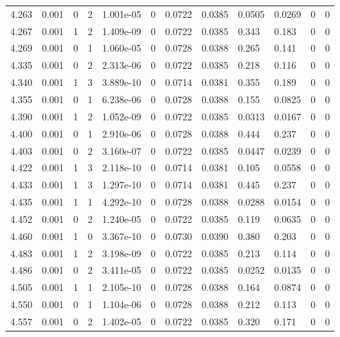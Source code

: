 \documentclass[preview]{standalone}
\begin{document}
{{{{{{\begin{tabular}{L{1.2cm}C{1.2cm} C{0.3cm}C{0.5cm} C{1.4cm}C{1.4cm} C{1.4cm}C{1.4cm} C{1.6cm}C{1.6cm} C{1.6cm}C{1.6cm}}
  4.263  &  0.001  & 0     &  2 &  1.001e-05  & 0  &  0.0722&   0.0385& 0.0505 & 0.0269   &  0 & 0  \\ 
  4.267  &  0.001  & 1     &  2 &  1.409e-09  & 0  &  0.0722&   0.0385& 0.343 & 0.183   &  0 & 0  \\ 
  4.269  &  0.001  & 0     &  1 &  1.060e-05  & 0  &  0.0728&   0.0388& 0.265 & 0.141   &  0 & 0  \\ 
  4.335  &  0.001  & 0     &  2 &  2.313e-06  & 0  &  0.0722&   0.0385& 0.218 & 0.116   &  0 & 0  \\ 
  4.340  &  0.001  & 1     &  3 &  3.889e-10  & 0  &  0.0714&   0.0381& 0.355 & 0.189   &  0 & 0  \\ 
  4.355  &  0.001  & 0     &  1 &  6.238e-06  & 0  &  0.0728&   0.0388& 0.155 & 0.0825   &  0 & 0  \\ 
  4.390  &  0.001  & 1     &  2 &  1.052e-09  & 0  &  0.0722&   0.0385& 0.0313 & 0.0167   &  0 & 0  \\ 
  4.400  &  0.001  & 0     &  1 &  2.910e-06  & 0  &  0.0728&   0.0388& 0.444 & 0.237   &  0 & 0  \\ 
  4.403  &  0.001  & 0     &  2 &  3.160e-07  & 0  &  0.0722&   0.0385& 0.0447 & 0.0239   &  0 & 0  \\ 
  4.422  &  0.001  & 1     &  3 &  2.118e-10  & 0  &  0.0714&   0.0381& 0.105 & 0.0558   &  0 & 0  \\ 
  4.433  &  0.001  & 1     &  3 &  1.297e-10  & 0  &  0.0714&   0.0381& 0.445 & 0.237   &  0 & 0  \\ 
  4.435  &  0.001  & 1     &  1 &  4.292e-10  & 0  &  0.0728&   0.0388& 0.0288 & 0.0154   &  0 & 0  \\ 
  4.452  &  0.001  & 0     &  2 &  1.240e-05  & 0  &  0.0722&   0.0385& 0.119 & 0.0635   &  0 & 0  \\ 
  4.460  &  0.001  & 1     &  0 &  3.367e-10  & 0  &  0.0730&   0.0390& 0.380 & 0.203   &  0 & 0  \\ 
  4.483  &  0.001  & 1     &  2 &  3.198e-09  & 0  &  0.0722&   0.0385& 0.213 & 0.114   &  0 & 0  \\ 
  4.486  &  0.001  & 0     &  2 &  3.411e-05  & 0  &  0.0722&   0.0385& 0.0252 & 0.0135   &  0 & 0  \\ 
  4.505  &  0.001  & 1     &  1 &  2.105e-10  & 0  &  0.0728&   0.0388& 0.164 & 0.0874   &  0 & 0  \\ 
  4.550  &  0.001  & 0     &  1 &  1.104e-06  & 0  &  0.0728&   0.0388& 0.212 & 0.113   &  0 & 0  \\ 
  4.557  &  0.001  & 0     &  2 &  1.402e-05  & 0  &  0.0722&   0.0385& 0.320 & 0.171   &  0 & 0  \\ 

\end{tabular}}}}}}}
\end{document}
